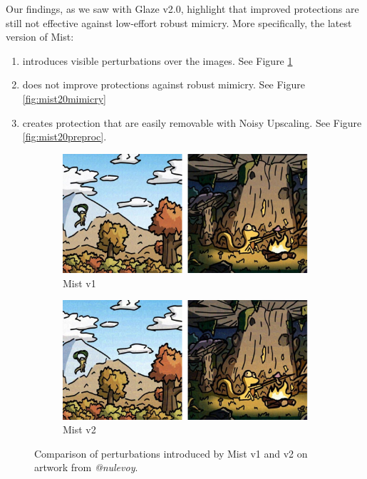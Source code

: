 \documentclass{article}
\begin{document}
Our findings, as we saw with Glaze v2.0, highlight that improved protections are still not effective against low-effort robust mimicry. More specifically, the latest version of Mist:
\begin{enumerate}
    \item introduces visible perturbations over the images. See Figure \ref{fig:mist20prot}
    \item does not improve protections against robust mimicry. See Figure \ref{fig:mist20mimicry}
    \item creates protection that are easily removable with Noisy Upscaling. See Figure \ref{fig:mist20preproc}.
\end{enumerate}

\begin{figure}[h]
    \centering
        \begin{subfigure}[b]{0.49\textwidth}
         \centering
         \includegraphics[width=\textwidth]{plots/protectedmist10.pdf}
         \caption{Mist v1}
     \end{subfigure}
     \hfill
     \begin{subfigure}[b]{0.49\textwidth}
         \centering
         \includegraphics[width=\textwidth]{plots/protectedmist20.pdf}
         \caption{Mist v2}
     \end{subfigure}
    \caption{Comparison of perturbations introduced by Mist v1 and v2 on artwork from \emph{@nulevoy}.}
    \label{fig:mist20prot}
\end{figure}
\end{document}
